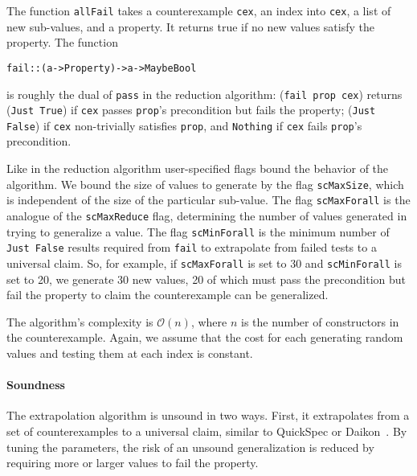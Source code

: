 \documentclass{sigplanconf}
\newenvironment{code}{\begin{alltt}\footnotesize}{\end{alltt}}
\newcommand{\ttp}[1]{\texttt{#1}}
\begin{document}
The function \ttp{allFail} takes a counterexample \ttp{cex}, an index into
\ttp{cex}, a list of new sub-values, and a property.  It returns true if no new
values satisfy the property.  The function
%
\begin{code}
fail :: (a -> Property) -> a -> Maybe Bool
\end{code}
%
\noindent
is roughly the dual of \ttp{pass} in the reduction algorithm: (\ttp{fail
  prop cex}) returns (\ttp{Just True}) if \ttp{cex} passes \ttp{prop}'s
precondition but fails the property; (\ttp{Just False}) if \ttp{cex}
non-trivially satisfies \ttp{prop}, and \ttp{Nothing} if \ttp{cex} fails
\ttp{prop}'s precondition.

Like in the reduction algorithm user-specified flags bound the behavior of the
algorithm.  We bound the size of values to generate by the flag \ttp{scMaxSize},
which is independent of the size of the particular sub-value.  The flag
\ttp{scMaxForall} is the analogue of the \ttp{scMaxReduce} flag, determining the
number of values generated in trying to generalize a value.  The flag
\ttp{scMinForall} is the minimum number of \ttp{Just False} results required
from \ttp{fail} to extrapolate from failed tests to a universal claim.  So, for
example, if \ttp{scMaxForall} is set to 30 and \ttp{scMinForall} is set to 20,
we generate 30 new values, 20 of which must pass the precondition but fail the
property to claim the counterexample can be generalized.

The algorithm's complexity is $\mathcal{O}(n)$, where $n$ is the number of
constructors in the counterexample.  Again, we assume that the cost for each
generating random values and testing them at each index is constant.

\paragraph{Soundness}
The extrapolation algorithm is unsound in two ways.  First, it extrapolates from
a set of counterexamples to a universal claim, similar to QuickSpec or
Daikon~\cite{qs,daikon}.  By tuning the parameters, the risk of an unsound
generalization is reduced by requiring more or larger values to fail the
property.
\end{document}
